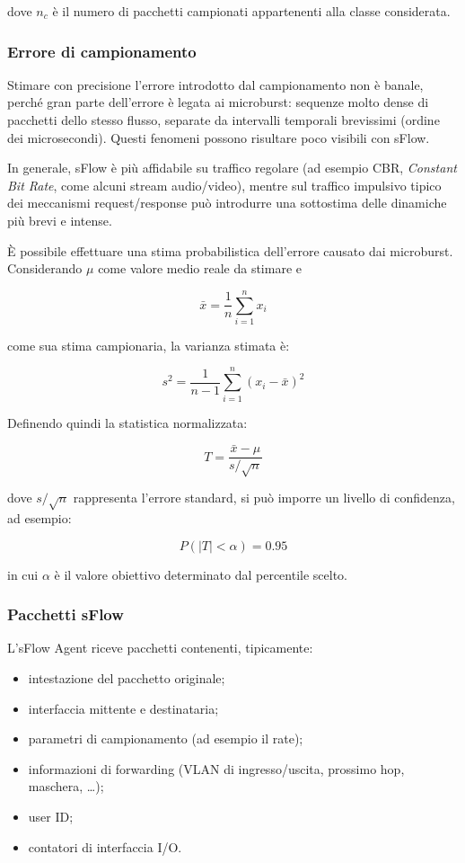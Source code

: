 dove $n_c$ è il numero di pacchetti campionati appartenenti alla classe
considerata.

\subsubsection{Errore di campionamento}

Stimare con precisione l'errore introdotto dal campionamento non è banale,
perché gran parte dell'errore è legata ai microburst: sequenze molto dense di
pacchetti dello stesso flusso, separate da intervalli temporali brevissimi
(ordine dei microsecondi). Questi fenomeni possono risultare poco visibili con
sFlow.

In generale, sFlow è più affidabile su traffico regolare (ad esempio CBR,
\textit{Constant Bit Rate}, come alcuni stream audio/video), mentre sul
traffico impulsivo tipico dei meccanismi request/response può introdurre
una sottostima delle dinamiche più brevi e intense.

È possibile effettuare una stima probabilistica dell'errore causato dai
microburst. Considerando $\mu$ come valore medio reale da stimare e

$$
\bar{x} = \frac{1}{n}\sum_{i=1}^{n} x_i
$$

come sua stima campionaria, la varianza stimata è:

$$
s^2 = \frac{1}{n-1}\sum_{i=1}^{n}(x_i - \bar{x})^2
$$

Definendo quindi la statistica normalizzata:

$$
T = \frac{\bar{x} - \mu}{s/\sqrt{n}}
$$

dove $s/\sqrt{n}$ rappresenta l'errore standard, si può imporre un livello
di confidenza, ad esempio:

$$
P\left(|T| < \alpha\right) = 0.95
$$

in cui $\alpha$ è il valore obiettivo determinato dal percentile scelto.

\subsubsection{Pacchetti sFlow}

L'sFlow Agent riceve pacchetti contenenti, tipicamente:

\begin{itemize}
\item intestazione del pacchetto originale;
\item interfaccia mittente e destinataria;
\item parametri di campionamento (ad esempio il rate);
\item informazioni di forwarding (VLAN di ingresso/uscita, prossimo hop,
maschera, \ldots);
\item user ID;
\item contatori di interfaccia I/O.
\end{itemize}

